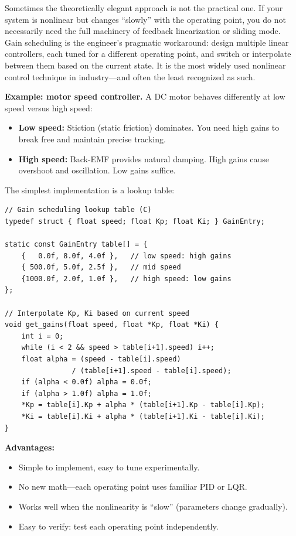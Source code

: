 Sometimes the theoretically elegant approach is not the practical one. If your system is nonlinear but changes ``slowly'' with the operating point, you do not necessarily need the full machinery of feedback linearization or sliding mode. Gain scheduling is the engineer's pragmatic workaround: design multiple linear controllers, each tuned for a different operating point, and switch or interpolate between them based on the current state. It is the most widely used nonlinear control technique in industry---and often the least recognized as such.

\textbf{Example: motor speed controller.} A DC motor behaves differently at low speed versus high speed:
\begin{itemize}[nosep]
    \item \textbf{Low speed:} Stiction (static friction) dominates. You need high gains to break free and maintain precise tracking.
    \item \textbf{High speed:} Back-EMF provides natural damping. High gains cause overshoot and oscillation. Low gains suffice.
\end{itemize}

The simplest implementation is a lookup table:

\begin{verbatim}
// Gain scheduling lookup table (C)
typedef struct { float speed; float Kp; float Ki; } GainEntry;

static const GainEntry table[] = {
    {   0.0f, 8.0f, 4.0f },   // low speed: high gains
    { 500.0f, 5.0f, 2.5f },   // mid speed
    {1000.0f, 2.0f, 1.0f },   // high speed: low gains
};

// Interpolate Kp, Ki based on current speed
void get_gains(float speed, float *Kp, float *Ki) {
    int i = 0;
    while (i < 2 && speed > table[i+1].speed) i++;
    float alpha = (speed - table[i].speed)
                / (table[i+1].speed - table[i].speed);
    if (alpha < 0.0f) alpha = 0.0f;
    if (alpha > 1.0f) alpha = 1.0f;
    *Kp = table[i].Kp + alpha * (table[i+1].Kp - table[i].Kp);
    *Ki = table[i].Ki + alpha * (table[i+1].Ki - table[i].Ki);
}
\end{verbatim}

\textbf{Advantages:}
\begin{itemize}[nosep]
    \item Simple to implement, easy to tune experimentally.
    \item No new math---each operating point uses familiar PID or LQR.
    \item Works well when the nonlinearity is ``slow'' (parameters change gradually).
    \item Easy to verify: test each operating point independently.
\end{itemize}

